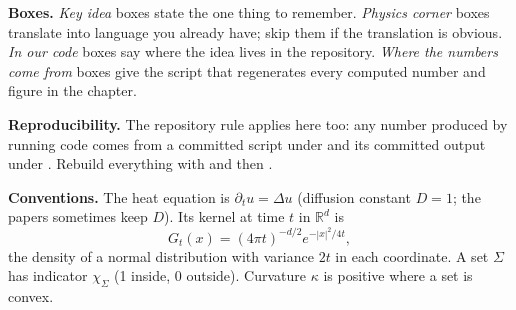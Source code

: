 \documentclass[11pt,a4paper]{report}
\newcommand{\R}{\mathbb{R}}
\begin{document}
\textbf{Boxes.} \emph{Key idea} boxes state the one thing to remember.
\emph{Physics corner} boxes translate into language you already have; skip them
if the translation is obvious. \emph{In our code} boxes say where the idea lives
in the repository. \emph{Where the numbers come from} boxes give the script that
regenerates every computed number and figure in the chapter.

\textbf{Reproducibility.} The repository rule applies here too: any number
produced by running code comes from a committed script under
 and its committed output under
. Rebuild everything with  and then .

\textbf{Conventions.} The heat equation is $\partial_t u = \Delta u$ (diffusion
constant $D = 1$; the papers sometimes keep $D$). Its kernel at time $t$ in
$\R^d$ is
\[
  G_t(x) = (4\pi t)^{-d/2} e^{-|x|^2/4t},
\]
the density of a normal distribution with variance $2t$ in each coordinate. A
set $\Sigma$ has indicator $\chi_\Sigma$ (1 inside, 0 outside). Curvature
$\kappa$ is positive where a set is convex.





\end{document}
